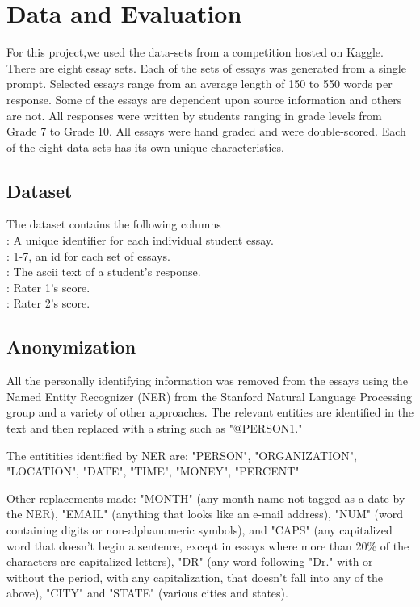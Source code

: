 \documentclass[BTech]{nitkdiss}
\begin{document}
\chapter{Data and Evaluation}
For this project,we used the data-sets from a competition hosted on Kaggle. There are eight essay sets. Each of the sets of essays was generated from a single prompt. Selected essays range from an average length of 150 to 550 words per response. Some of the essays are dependent upon source information and others are not. All responses were written by students ranging in grade levels from Grade 7 to Grade 10. All essays were hand graded and were double-scored. Each of the eight data sets has its own unique characteristics. 

\section{Dataset}
The dataset contains the following columns\\
 : A unique identifier for each individual student essay.\\
 : 1-7, an id for each set of essays.\\
 : The ascii text of a student's response.\\
 : Rater 1's score.\\
 : Rater 2's score.\\

\section{Anonymization}

All the personally identifying information was removed from the essays using the Named Entity Recognizer (NER) from the Stanford Natural Language Processing group and a variety of other approaches. The relevant entities are identified in the text and then replaced with a string such as "@PERSON1."

The entitities identified by NER are: "PERSON", "ORGANIZATION", "LOCATION", "DATE", "TIME", "MONEY", "PERCENT"

Other replacements made: "MONTH" (any month name not tagged as a date by the NER), "EMAIL" (anything that looks like an e-mail address), "NUM" (word containing digits or non-alphanumeric symbols), and "CAPS" (any capitalized word that doesn't begin a sentence, except in essays where more than 20\% of the characters are capitalized letters), "DR" (any word following "Dr." with or without the period, with any capitalization, that doesn't fall into any of the above), "CITY" and "STATE" (various cities and states).
\end{document}
